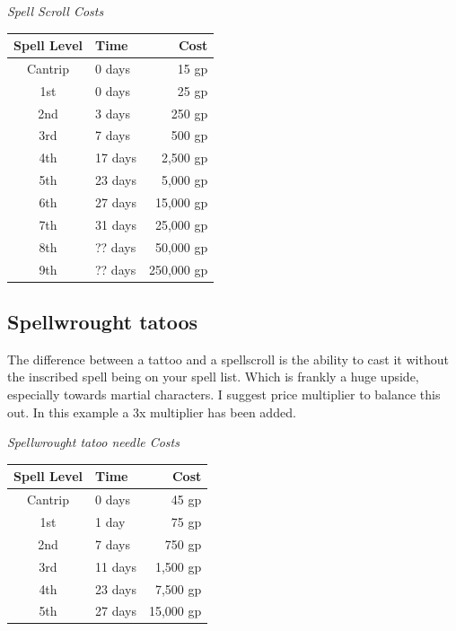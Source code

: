 \documentclass{article}
\begin{document}
    \large \textit{Spell Scroll Costs} \normalsize

    \begin{tabular}{|clr|}
        \hline
        Spell Level	&Time	&Cost\\\hline
        Cantrip	&0  days	&15 gp\\\hline
        1st	    &0  days	&25 gp\\\hline
        2nd	    &3  days	&250 gp\\\hline
        3rd	    &7  days 	&500 gp\\\hline
        4th	    &17 days    &2,500 gp\\\hline
        5th	    &23 days    &5,000 gp\\\hline
        6th	    &27 days    &15,000 gp\\\hline
        7th	    &31 days    &25,000 gp\\\hline
        8th	    &?? days    &50,000 gp\\\hline
        9th	    &?? days    &250,000 gp\\\hline
    \end{tabular}

    \subsection*{Spellwrought tatoos}

    The difference between a tattoo and a spellscroll is the ability to cast it without the inscribed spell being on your spell list. 
    Which is frankly a huge upside, especially towards martial characters. I suggest price multiplier to balance this out. In this example a 3x multiplier has been added.

    \large \textit{Spellwrought tatoo needle Costs} \normalsize

    \begin{tabular}{|clr|}
        \hline
        Spell Level	&Time	&Cost\\\hline
        Cantrip	&0  days	&45 gp\\\hline
        1st	    &1  day 	&75 gp\\\hline
        2nd	    &7  days	&750 gp\\\hline
        3rd	    &11 days 	&1,500 gp\\\hline
        4th	    &23 days    &7,500 gp\\\hline
        5th	    &27 days    &15,000 gp\\\hline
    \end{tabular}
\end{document}
